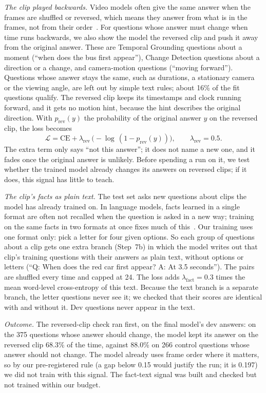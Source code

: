 \emph{The clip played backwards.} Video models often give the same answer
when the frames are shuffled or reversed, which means they answer from what
is in the frames, not from their order~\cite{kang2026bpo}. For questions
whose answer must change when time runs backwards, we also show the model
the reversed clip and push it away from the original answer. These are
Temporal Grounding questions about a moment (``when does the bus first
appear''), Change Detection questions about a direction or a change, and
camera-motion questions (``moving forward''). Questions whose answer stays
the same, such as durations, a stationary camera or the viewing angle, are
left out by simple text rules; about 16\% of the fit questions qualify. The
reversed clip keeps its timestamps and clock running forward, and it gets
no motion hint, because the hint describes the original direction. With
$p_{\text{rev}}(y)$ the probability of the original answer $y$ on the
reversed clip, the loss becomes
\[
\mathcal{L} = \mathrm{CE} + \lambda_{\text{rev}}\,
\bigl(-\log\,(1 - p_{\text{rev}}(y))\bigr),\qquad \lambda_{\text{rev}} = 0.5 .
\]
The extra term only says ``not this answer''; it does not name a new one,
and it fades once the original answer is unlikely. Before spending a run on
it, we test whether the trained model already changes its answers on
reversed clips; if it does, this signal has little to teach.

\emph{The clip's facts as plain text.} The test set asks new questions about
clips the model has already trained on. In language models, facts learned
in a single format are often not recalled when the question is asked in a
new way; training on the same facts in two formats at once fixes much of
this~\cite{zhang2025factrecall}. Our training uses one format only: pick a
letter for four given options. So each group of questions about a clip gets
one extra branch (Step~7b) in which the model writes out that clip's
training questions with their answers as plain text, without options or
letters (``Q: When does the red car first appear? A: At 3.5 seconds''). The
pairs are shuffled every time and capped at 24. The loss adds
$\lambda_{\text{fact}} = 0.3$ times the mean word-level cross-entropy of this
text. Because the text branch is a separate branch, the letter questions
never see it; we checked that their scores are identical with and without
it. Dev questions never appear in the text.

\emph{Outcome.} The reversed-clip check ran first, on the final model's
dev answers: on the 375 questions whose answer should change, the model
kept its answer on the reversed clip 68.3\% of the time, against 88.0\% on
266 control questions whose answer should not change. The model already
uses frame order where it matters, so by our pre-registered rule (a gap
below 0.15 would justify the run; it is 0.197) we did not train with this
signal. The fact-text signal was built and checked but not trained within
our budget.

